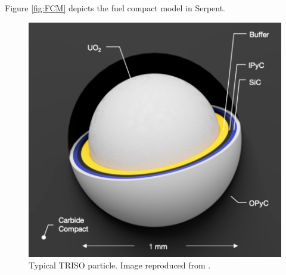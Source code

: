 \documentclass[11pt,letterpaper]{article}
\begin{document}
Figure \ref{fig:FCM} depicts the fuel compact model in Serpent.

	\begin{figure}[]
		\centering
		\includegraphics[width=0.5\linewidth]{figures/triso1.png}
		\hfill
		\caption{Typical TRISO particle. Image reproduced from \cite{usnc_mmr_2019}.}
		\label{fig:triso}
	\end{figure}
\end{document}
